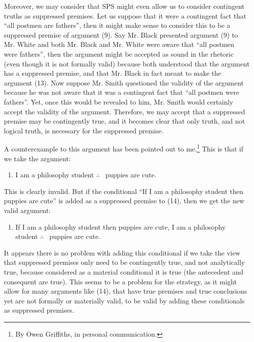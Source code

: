 Moreover, we may consider that SPS might even allow us to consider
contingent truths as suppressed premises. Let us suppose that it were a
contingent fact that ``all postmen are fathers'', then it might make
sense to consider this to be a suppressed premise of argument (9). Say
Mr. Black presented argument (9) to Mr. White and both Mr. Black and Mr.
White were aware that ``all postmen were fathers'', then the argument
might be accepted as sound in the rhetoric (even though it is not
formally valid) because both understood that the argument has a
suppressed premise, and that Mr. Black in fact meant to make the
argument (13). Now suppose Mr. Smith questioned the validity of the
argument because he was not aware that it was a contingent fact that
``all postmen were fathers''. Yet, once this would be revealed to him,
Mr. Smith would certainly accept the validity of the argument.
Therefore, we may accept that a suppressed premise may be contingently
true, and it becomes clear that only truth, and not logical truth, is
necessary for the suppressed premise.

A counterexample to this argument has been pointed out to me.\footnote{By
  Owen Griffiths, in personal communication.} This is that if we take
the argument:

\begin{enumerate}[leftmargin=42] 
\def\labelenumi{(\arabic{enumi})}
\setcounter{enumi}{13}
\item
  I am a philosophy student $\therefore$ \ puppies are cute.
\end{enumerate}

\noindent This is clearly invalid. But if the conditional ``If I am a philosophy
student then puppies are cute'' is added as a suppressed premise to
(14), then we get the new valid argument:

\begin{enumerate}[leftmargin=42] 
\def\labelenumi{(\arabic{enumi})}
\setcounter{enumi}{14}
\item
  If I am a philosophy student then puppies are cute, I am a
philosophy student $\therefore$ \ puppies are cute.
\end{enumerate}

\noindent It appears there is no problem with adding this conditional if we take
the view that suppressed premises only need to be contingently true, and
not analytically true, because considered as a material conditional it
is true (the antecedent and consequent are true). This seems to be a
problem for the strategy, as it might allow for many arguments like
(14), that have true premises and true conclusions yet are not formally
or materially valid, to be valid by adding these conditionals as
suppressed premises.

